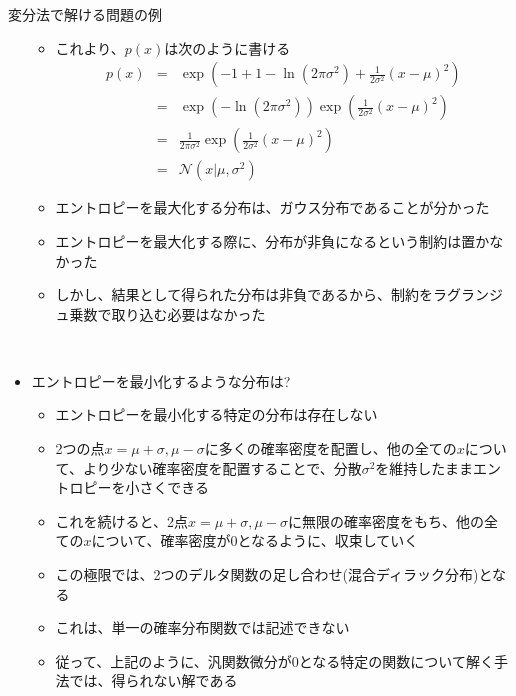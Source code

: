 \documentclass[dvipdfmx,notheorems,t]{beamer}
\begin{document}
\begin{frame}{変分法で解ける問題の例}
\begin{itemize}
\begin{itemize}
		\item これより、$p(x)$は次のように書ける
		\begin{eqnarray}
			p(x) &=& \exp \left( -1 + 1 - \ln \left( 2 \pi \sigma^2 \right) + \frac{1}{2 \sigma^2} (x - \mu)^2 \right) \nonumber \\
			&=& \exp \left( - \ln \left( 2 \pi \sigma^2 \right) \right) \exp \left( \frac{1}{2 \sigma^2} (x - \mu)^2 \right) \nonumber \\
			&=& \frac{1}{2 \pi \sigma^2} \exp \left( \frac{1}{2 \sigma^2} (x - \mu)^2 \right) \\
			&=& \mathcal{N}(x | \mu, \sigma^2)
		\end{eqnarray}
		
		\item エントロピーを最大化する分布は、ガウス分布であることが分かった
		\newline
		
		\item エントロピーを最大化する際に、分布が非負になるという制約は置かなかった
		\item しかし、結果として得られた分布は非負であるから、制約をラグランジュ乗数で取り込む必要はなかった
	\end{itemize} \
	
	\item エントロピーを最小化するような分布は?
	\begin{itemize}
		\item エントロピーを最小化する特定の分布は存在しない
		\newline
		\item 2つの点$x = \mu + \sigma, \mu - \sigma$に多くの確率密度を配置し、他の全ての$x$について、より少ない確率密度を配置することで、分散$\sigma^2$を維持したままエントロピーを小さくできる
		\newline
		\item これを続けると、2点$x = \mu + \sigma, \mu - \sigma$に無限の確率密度をもち、他の全ての$x$について、確率密度が$0$となるように、収束していく
		\item この極限では、2つのデルタ関数の足し合わせ(混合ディラック分布)となる
		\item これは、単一の確率分布関数では記述できない
		\item 従って、上記のように、汎関数微分が$0$となる特定の関数について解く手法では、得られない解である
	\end{itemize}
\end{itemize}

\end{frame}
\end{document}
